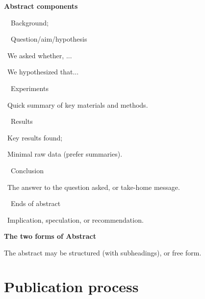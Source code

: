 \documentclass[a4paper, 12pt]{article}
\begin{document}
\textbf{Abstract components}
\par\ \textbullet\ Background;
\par\ \textbullet\ Question/aim/hypothesis
\par\quad\textopenbullet\ We asked whether, ...
\par\quad\textopenbullet\ We hypothesized that...
\par\ \textbullet\ Experiments
\par\quad\textopenbullet\ Quick summary of key materials and methods.
\par\ \textbullet\ Results
\par\quad\textopenbullet\ Key results found;
\par\quad\textopenbullet\ Minimal raw data (prefer summaries).
\par\ \textbullet\ Conclusion
\par\quad\textopenbullet\ The answer to the question asked, or take-home message.
\par\ \textbullet\ Ends of abstract
\par\quad\textopenbullet\ Implication, speculation, or recommendation.

\textbf{The two forms of Abstract}
\par The abstract may be structured (with subheadings), or free form.

\newpage\quad

\newpage\section{Publication process}
\end{document}
